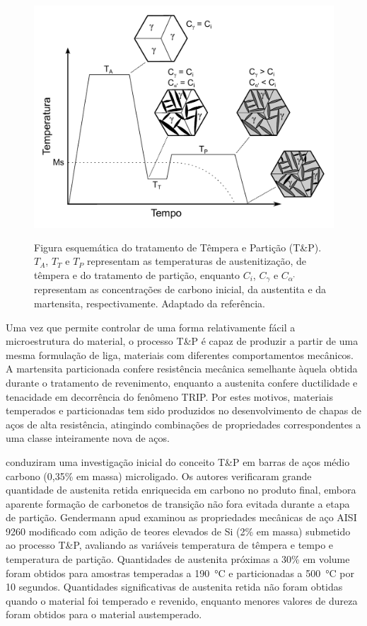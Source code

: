 \begin{figure}
  \includegraphics[height=9cm]{img/esquemaTP.pdf}
  \caption{Figura esquemática do tratamento de Têmpera e Partição (T\&P). $T_A$, $T_T$ e $T_P$ representam as temperaturas de austenitização, de têmpera e do tratamento de partição, enquanto $C_{i}$, $C_{\gamma}$ e $C_{\alpha\text{'}}$ representam as concentrações de carbono inicial, da austentita e da martensita, respectivamente. Adaptado da referência\cite{Edmonds2006}. }
  \label{fig:esqTP}
\end{figure}

Uma vez que permite controlar de uma forma relativamente fácil a microestrutura do material, o processo T\&P é capaz de produzir a partir de uma mesma formulação de liga, materiais com diferentes comportamentos mecânicos. A martensita particionada confere resistência mecânica semelhante àquela obtida durante o tratamento de revenimento, enquanto a austenita confere ductilidade e tenacidade em decorrência do fenômeno TRIP\cite{Matlock2010}. Por estes motivos, materiais temperados e particionadas tem sido produzidos no desenvolvimento de chapas de aços de alta resistência, atingindo combinações de propriedades correspondentes a uma classe inteiramente nova de aços.

 conduziram uma investigação inicial do conceito T\&P em barras de aços médio carbono (0,35\% em massa) microligado. Os autores verificaram grande quantidade de austenita retida enriquecida em carbono no produto final, embora aparente formação de carbonetos de transição não fora evitada durante a etapa de partição. Gendermann apud\cite{Speer2004} examinou as propriedades mecânicas de aço AISI 9260 modificado com adição de teores elevados de Si (2\% em massa) submetido ao processo T\&P, avaliando as variáveis temperatura de têmpera e tempo e temperatura de partição. Quantidades de austenita próximas a 30\% em volume foram obtidos para amostras temperadas a \SI{190}{\degreeCelsius} e particionadas a \SI{500}{\degreeCelsius} por 10 segundos. Quantidades significativas de austenita retida não foram obtidas quando o material foi temperado e revenido, enquanto menores valores de dureza foram obtidos para o material austemperado.

